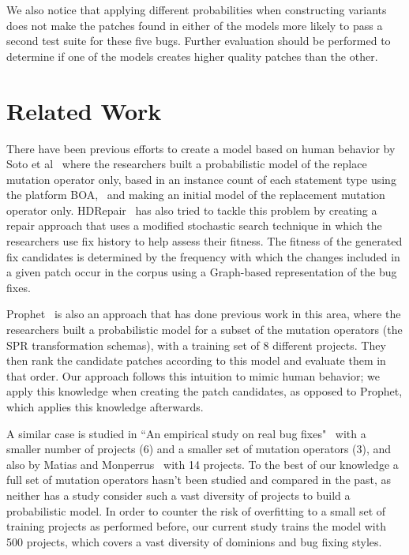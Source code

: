 \documentclass[conference]{IEEEtran}
\begin{document}
We also notice that applying different probabilities when constructing variants
does not make the patches found in either of the models more likely to pass a
second test suite for these five bugs. Further evaluation should be performed to
determine if one of the models creates higher quality patches than the other. 



\section{Related Work} \label{relatedWork}

There have been previous efforts to create a model based on human behavior by Soto et al~\cite{Soto15} 
where the researchers built a probabilistic model of the replace mutation 
operator only, based in 
an instance count of each statement type using the platform 
BOA,~\cite{dyer2013} and making an initial model of the replacement mutation 
operator only. HDRepair~\cite{xuan16} has also tried to tackle this problem by 
creating a repair approach that uses a modified stochastic search
technique in which the researchers use fix history
to help assess their fitness. The fitness of the generated
fix candidates is determined by the frequency with which the changes included in a given patch occur in the corpus using a Graph-based representation of the bug fixes.

Prophet~\cite{long15} is also an approach that has done previous work in this 
area, where the researchers built a 
probabilistic model for a subset of the mutation operators (the SPR transformation schemas), with a training set 
of 8 different projects. They then rank the candidate patches according to this model and evaluate them in that order. Our approach follows this intuition to mimic human behavior; we apply this knowledge when creating the patch candidates, as opposed to Prophet, which applies this knowledge afterwards. 

A similar case is studied in ``An empirical study on 
real bug fixes"~\cite{zhong15} with a smaller number of projects (6) and a 
smaller set of 
mutation operators (3), and also by Matias and Monperrus~\cite{matias15} with 14 
projects. To the best of our knowledge a full set of mutation 
operators hasn't been studied and compared in the past, as neither has a study 
consider such a vast diversity of projects to build a probabilistic model. In 
order to counter the 
risk of overfitting to a small set of training projects as performed before, our 
current study trains the model with 500 projects, which covers a vast diversity 
of dominions and bug fixing styles.
\end{document}
